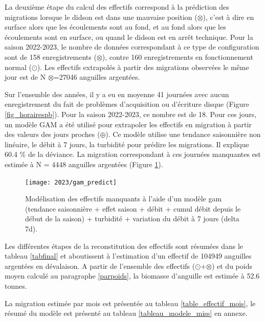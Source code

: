 \documentclass[11pt,twocolumn,titlepage,twoside]{article}
\begin{document}
La deuxième étape du calcul des effectifs correspond à la prédiction des
migrations lorsque le didson est dans une mauvaise position ($\otimes$), c'est à
dire en surface alors que les écoulements sont au fond, et au fond alors que les
écoulements sont en surface, ou quand le didson est en arrêt technique. Pour la
saison 2022-2023, le nombre de données correspondant à ce type de configuration
sont de \num{158} enregistrements  ($\otimes$), contre
\num{160} enregistrements en fonctionnement normal
($\odot$). Les effectifs extrapolés à partir des migrations observées le même
jour est de  N $\otimes$=\num{27046} anguilles argentées.

Sur l'ensemble des années, il y a eu en moyenne
\num{41} journées avec aucun enregistrement du fait de problèmes d'acquisition ou
d'écriture disque (Figure \ref{fig_horairespb}). Pour la saison 2022-2023,
ce nombre est de \num{18}.
Pour ces jours, un modèle GAM a été utilisé pour extrapoler 
 les effectifs en migration à partir des valeurs des jours proches ($\oplus$).
 Ce modèle utilise une tendance saisonnière non linéaire, le débit à 7 jours, la
 turbidité pour prédire les migrations. Il explique
 \num{60.4} \% de la déviance. La
 migration correspondant à ces journées manquantes est estimée à N = \num{4448} anguilles argentées (Figure \ref{gam_predict}).
 
\begin{figure}[htbp]
  \centering
  \texttt{[image: 2023/gam\_predict]}
  \caption[Modèle prédiction effectifs manquants]{Modélisation des effectifs
  manquants à l'aide d'un modèle gam (tendance saisonnière + effet saison +
  débit + cumul débit depuis le début de la saison) + turbidité + variation du
  débit à 7 jours (delta 7d).}
  \label{gam_predict}
\end{figure}

Les différentes étapes de la reconstitution des effectifs sont résumées dans le tableau \ref{tabfinal} et
aboutissent à l'estimation d'un effectif de \num{104949}
anguilles argentées en dévalaison.
A partir de l'ensemble des effectifs ($\odot$+$\otimes$) et du poids moyen calculé au paragraphe
\ref{parpoids}, la biomasse d'anguille est estimée à
\num[round-precision=1]{52.6} tonnes.

La migration estimée par mois est présentée au tableau
\ref{table_effectif_mois}, le résumé du modèle est présenté au tableau
\ref{tableau_modele_miss} en annexe. 
\end{document}
